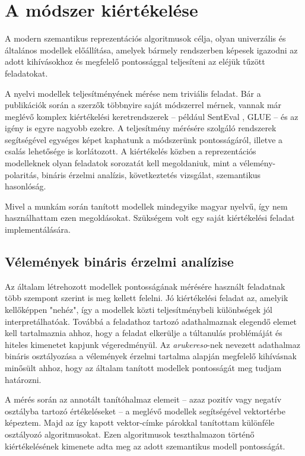 \chapter{A módszer kiértékelése}
\label{ch:eval}

A modern szemantikus reprezentációs algoritmusok célja, olyan univerzális és általános modellek előállítása, amelyek bármely rendszerben képesek igazodni az adott kihívásokhoz és megfelelő pontossággal teljesíteni az eléjük tűzött feladatokat.

A nyelvi modellek teljesítményének mérése nem triviális feladat. Bár a publikációk során a szerzők többnyire saját módszerrel mérnek, vannak már meglévő komplex kiértékelési keretrendszerek – például SentEval \cite{senteval}, GLUE \cite{glue} – és az igény is egyre nagyobb ezekre. A teljesítmény mérésére szolgáló rendszerek segítségével egységes képet kaphatunk a módszerünk pontosságáról, illetve a csalás lehetősége is korlátozott. A kiértékelés közben a reprezentációs modelleknek olyan feladatok sorozatát kell megoldaniuk, mint a vélemény-polaritás, bináris érzelmi analízis, következtetés vizsgálat, szemantikus hasonlóság.

Mivel a munkám során tanított modellek mindegyike magyar nyelvű, így nem használhattam ezen megoldásokat. Szükségem volt egy saját kiértékelési feladat implementálására.

\section{Vélemények bináris érzelmi analízise}

Az általam létrehozott modellek pontosságának mérésére használt feladatnak több szempont szerint is meg kellett felelni. Jó kiértékelési feladat az, amelyik kellőképpen "nehéz", így a modellek közti teljesítménybeli különbségek jól interpretálhatóak. Továbbá a feladathoz tartozó adathalmaznak elegendő elemet kell tartalmaznia ahhoz, hogy a feladat elkerülje a túltanulás problémáját és hiteles kimenetet kapjunk végeredményül. Az \textit{arukereso}-nek nevezett adathalmaz bináris osztályozása a vélemények érzelmi tartalma alapján megfelelő kihívásnak minősült ahhoz, hogy az általam tanított modellek pontosságát meg tudjam határozni.

A mérés során az annotált tanítóhalmaz elemeit – azaz pozitív vagy negatív osztályba tartozó értékeléseket – a meglévő modellek segítségével vektortérbe képeztem. Majd az így kapott vektor-címke párokkal tanítottam különféle osztályozó algoritmusokat. Ezen algoritmusok teszthalmazon történő kiértékelésének kimenete adta meg az adott szemantikus modell pontosságát.

